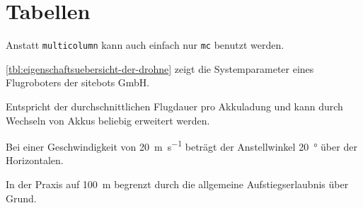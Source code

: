 \section{Tabellen}
\label{sec:tabellen}

Anstatt \texttt{multicolumn} kann auch einfach nur \texttt{mc} benutzt werden.


\ref{tbl:eigenschaftsuebersicht-der-drohne} zeigt die Systemparameter eines Flugroboters der sitebots GmbH.
\begin{table}[h]
  \centering
  \begin{threeparttable}
    \begin{tablenotes}
      \footnotesize
      \item[1)] Entspricht der durchschnittlichen Flugdauer pro Akkuladung und kann durch Wechseln von Akkus beliebig erweitert werden.
      \item[2)] Bei einer Geschwindigkeit von \SI{20}{\meter\per\second} beträgt der Anstellwinkel \SI{20}{\degree} über der Horizontalen.
      \item[3)] In der Praxis auf \SI{100}{\meter} begrenzt durch die allgemeine Aufstiegserlaubnis über Grund.
    \end{tablenotes}
  \end{threeparttable}
  \caption[Systemparameter der Drohne]{Systemparameter der Drohne nach \citet[S.~9]{Bachelorthesis.2016}}
  \label{tbl:eigenschaftsuebersicht-der-drohne}
\end{table}


